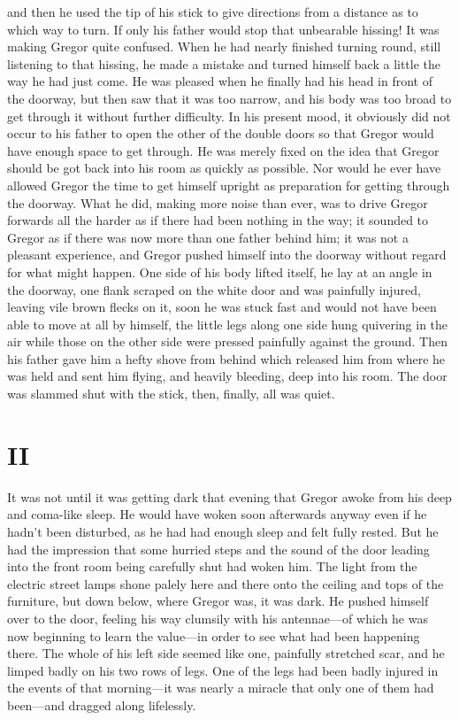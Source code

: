 and then he used the tip of his stick to give directions from a
distance as to which way to turn. If only his father would stop that
unbearable hissing! It was making Gregor quite confused. When he had
nearly finished turning round, still listening to that hissing, he made
a mistake and turned himself back a little the way he had just come. He
was pleased when he finally had his head in front of the doorway, but
then saw that it was too narrow, and his body was too broad to get
through it without further difficulty. In his present mood, it
obviously did not occur to his father to open the other of the double
doors so that Gregor would have enough space to get through. He was
merely fixed on the idea that Gregor should be got back into his room
as quickly as possible. Nor would he ever have allowed Gregor the time
to get himself upright as preparation for getting through the doorway.
What he did, making more noise than ever, was to drive Gregor forwards
all the harder as if there had been nothing in the way; it sounded to
Gregor as if there was now more than one father behind him; it was not
a pleasant experience, and Gregor pushed himself into the doorway
without regard for what might happen. One side of his body lifted
itself, he lay at an angle in the doorway, one flank scraped on the
white door and was painfully injured, leaving vile brown flecks on it,
soon he was stuck fast and would not have been able to move at all by
himself, the little legs along one side hung quivering in the air while
those on the other side were pressed painfully against the ground. Then
his father gave him a hefty shove from behind which released him from
where he was held and sent him flying, and heavily bleeding, deep into
his room. The door was slammed shut with the stick, then, finally, all
was quiet.


\chapter{II}

It was not until it was getting dark that evening that Gregor awoke
from his deep and coma-like sleep. He would have woken soon afterwards
anyway even if he hadn’t been disturbed, as he had had enough sleep and
felt fully rested. But he had the impression that some hurried steps
and the sound of the door leading into the front room being carefully
shut had woken him. The light from the electric street lamps shone
palely here and there onto the ceiling and tops of the furniture, but
down below, where Gregor was, it was dark. He pushed himself over to
the door, feeling his way clumsily with his antennae—of which he was
now beginning to learn the value—in order to see what had been
happening there. The whole of his left side seemed like one, painfully
stretched scar, and he limped badly on his two rows of legs. One of the
legs had been badly injured in the events of that morning—it was nearly
a miracle that only one of them had been—and dragged along lifelessly.

